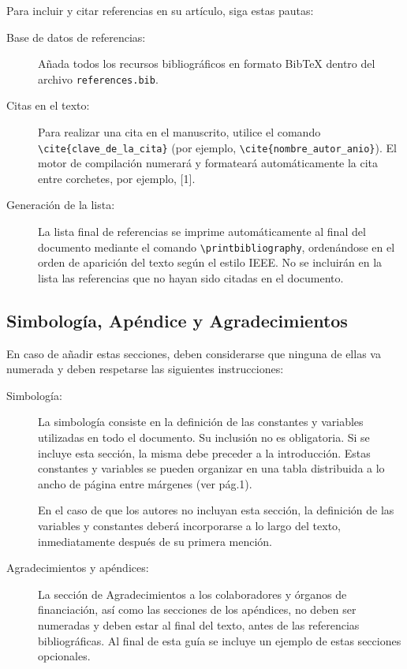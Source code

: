\documentclass[a4paper, 12pt]{article}
\begin{document}
Para incluir y citar referencias en su artículo, siga estas pautas:
\begin{description}
  \item[Base de datos de referencias:] Añada todos los recursos bibliográficos en formato BibTeX dentro del archivo \texttt{references.bib}.
  \item[Citas en el texto:] Para realizar una cita en el manuscrito, utilice el comando \texttt{\textbackslash cite\{\allowbreak clave\_\allowbreak de\_\allowbreak la\_\allowbreak cita\}} (por ejemplo, \texttt{\textbackslash cite\{\allowbreak nombre\_\allowbreak autor\_\allowbreak anio\}}). El motor de compilación numerará y formateará automáticamente la cita entre corchetes, por ejemplo, [1].
  \item[Generación de la lista:] La lista final de referencias se imprime automáticamente al final del documento mediante el comando \texttt{\textbackslash print\allowbreak bibliography}, ordenándose en el orden de aparición del texto según el estilo IEEE. No se incluirán en la lista las referencias que no hayan sido citadas en el documento.
\end{description}

\subsection{Simbología, Apéndice y Agradecimientos}

En caso de añadir estas secciones, deben considerarse que ninguna de ellas va numerada y deben respetarse las siguientes instrucciones:
\begin{description}
  \item[Simbología:] La simbología consiste en la definición de las constantes y variables utilizadas en todo el documento. Su inclusión no es obligatoria. Si se incluye esta sección, la misma debe preceder a la introducción. Estas constantes y variables se pueden organizar en una tabla distribuida a lo ancho de página entre márgenes (ver pág.1).
  
  En el caso de que los autores no incluyan esta sección, la definición de las variables y constantes deberá incorporarse a lo largo del texto, inmediatamente después de su primera mención.

  \item[Agradecimientos y apéndices:] La sección de Agradecimientos a los colaboradores y órganos de financiación, así como las secciones de los apéndices, no deben ser numeradas y deben estar al final del texto, antes de las referencias bibliográficas. Al final de esta guía se incluye un ejemplo de estas secciones opcionales.
\end{description}
\end{document}
